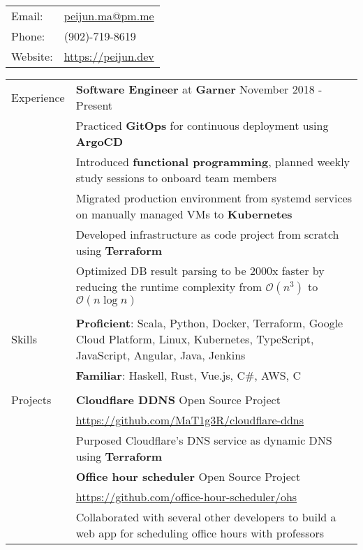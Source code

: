 \documentclass[letterpaper,12pt,oneside]{article}
\newcommand{\smallurl}[1]{\scriptsize{\url{#1}}}
\newcommand{\tabitem}{\hspace{0.2cm}\textbullet\hspace{0.2cm}}
\begin{document}
\begin{tabular}{l l}
    Email: & \href{mailto:peijun.ma@pm.me}{peijun.ma@pm.me} \\
    Phone: & (902)-719-8619 \\
    Website: & \href{https://peijun.dev}{https://peijun.dev}
\end{tabular}

\noindent \begin{longtable}{@{} l p{14cm}}
\Large{Experience}
& \textbf{Software Engineer} at \textbf{Garner} \hspace*{\fill} November 2018 - Present \\
& \tabitem
Practiced \textbf{GitOps} for continuous deployment using \textbf{ArgoCD} \\
& \tabitem
Introduced \textbf{functional programming}, planned weekly study sessions to onboard team members \\
& \tabitem
Migrated production environment from systemd services on manually managed VMs to \textbf{Kubernetes} \\
& \tabitem
Developed infrastructure as code project from scratch using \textbf{Terraform} \\
& \tabitem
Optimized DB result parsing to be 2000x faster by reducing the runtime complexity from $\mathcal{O}(n^3)$ to $\mathcal{O}(n\log{}n)$ \\
& \\
\Large{Skills}
& \textbf{Proficient}: Scala, Python, Docker, Terraform, Google Cloud Platform, Linux, Kubernetes, TypeScript, JavaScript, Angular, Java, Jenkins \\
& \textbf{Familiar}: Haskell, Rust, Vue.js, C\#, AWS, C \\
& \\
\Large{Projects}
& \textbf{Cloudflare DDNS} \hspace*{\fill} Open Source Project \\
& \smallurl{https://github.com/MaT1g3R/cloudflare-ddns} \\
& \tabitem
Purposed Cloudflare's DNS service as dynamic DNS using \textbf{Terraform} \\
& \textbf{Office hour scheduler}\hspace*{\fill} Open Source Project \\
& \smallurl{https://github.com/office-hour-scheduler/ohs} \\
& \tabitem
Collaborated with several other developers to build a web app for scheduling office hours with professors \\

\end{longtable}
\end{document}
